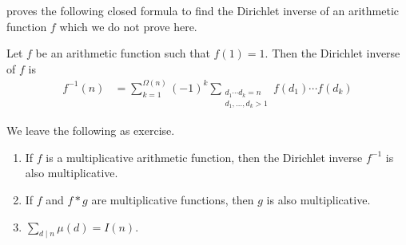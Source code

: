 \documentclass[elemannt.tex]{subfile}
\begin{document}
	\textcite[Theorem 2.2]{haukkanen_2000} proves the following closed formula to find the Dirichlet inverse of an arithmetic function $f$ which we do not prove here.
		\begin{theorem}
			Let $f$ be an arithmetic function such that $f(1)=1$. Then the Dirichlet inverse of $f$ is
				\begin{align*}
					f^{-1}(n)
						& = \sum_{k=1}^{\Omega(n)}(-1)^{k}\sum_{\substack{d_{1}\cdots d_{k}=n\\d_{1},\ldots,d_{k}>1}}f(d_{1})\cdots f(d_{k})
				\end{align*}
		\end{theorem}
	We leave the following as exercise.
		\begin{enumerate}
			\item If $f$ is a multiplicative arithmetic function, then the Dirichlet inverse $f^{-1}$ is also multiplicative.
			\item If $f$ and $f\ast g$ are multiplicative functions, then $g$ is also multiplicative.
			\item $\sum_{d\mid n}\mu(d)=I(n)$.
		\end{enumerate}
\end{document}
